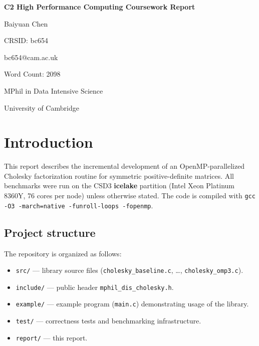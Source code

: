\documentclass[10pt,leqno]{amsart}
\begin{document}
\begin{titlepage}
\centering
\vspace*{2cm}

{\LARGE \bfseries C2 High Performance Computing Coursework Report\par}

\vspace{1.5cm}

{\large Baiyuan Chen\par}
\vspace{0.3cm}
{\large CRSID: bc654\par}
\vspace{0.3cm}
{\large bc654@cam.ac.uk\par}

\vspace{1.5cm}

{\large Word Count: 2098\par}

\vspace{1.5cm}

{\large MPhil in Data Intensive Science\par}
\vspace{0.3cm}
{\large University of Cambridge\par}
\vspace{1.5cm}

\vfill
\end{titlepage}

\setcounter{section}{-1}
\section{Introduction}

This report describes the incremental development of an OpenMP-parallelized 
Cholesky factorization routine for symmetric positive-definite matrices. 
All benchmarks were run on the CSD3 
\textbf{icelake} partition (Intel Xeon Platinum 8360Y, 76 cores per node) 
unless otherwise stated. The code is compiled with 
\texttt{gcc -O3 -march=native -funroll-loops -fopenmp}.

\subsection{Project structure}

The repository is organized as follows:
\begin{itemize}
  \item \texttt{src/} --- library source files (\texttt{cholesky\_baseline.c}, 
  \ldots, \texttt{cholesky\_omp3.c}).
  \item \texttt{include/} --- public header \texttt{mphil\_dis\_cholesky.h}.
  \item \texttt{example/} --- example program (\texttt{main.c}) demonstrating 
  usage of the library.
  \item \texttt{test/} --- correctness tests and benchmarking infrastructure.
  \item \texttt{report/} --- this report.
\end{itemize}
\end{document}
